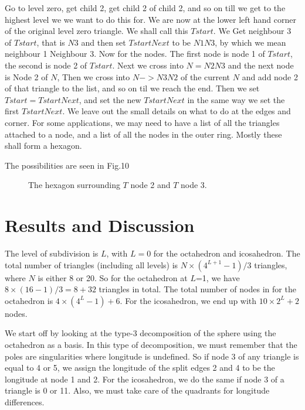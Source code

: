 \documentclass[12pt]{article}
\begin{document}
Go to level zero, get child 2, get child 2 of child 2, and so on till
we get to the highest level we we want to do this for. We are now at
the lower left hand corner of the original level zero triangle. We shall call this
$Tstart$. We Get neighbour 3 of $Tstart$, that is $N3$ and then 
set $TstartNext$ to be $N1N3$, by which we mean neighbour 1 Neighbour 3.
Now for the nodes. The first node is node 1 of $Tstart$, the second is
 node 2 of $Tstart$. Next we cross into $N=N2N3$ and the next node is Node
2 of $N$, Then we cross into $N->N3N2$ of the current $N$ and add node 2 of
that triangle to the list, and so on til we reach the end. Then we
set $Tstart=TstartNext$, and set the new $TstartNext$ in the same way we
set the first $TstartNext$. We leave out the small details on what to do
at the edges and corner.  For some applications, we may need to have
a list of all the triangles attached to a node, and a list of all the
nodes in the outer ring. Mostly these shall form a hexagon.

The possibilities are seen in Fig.10
\vspace*{10cm}
\begin{figure}[htb]
\caption{ 
The hexagon surrounding $T$ node 2 and $T$ node 3.
}
\end{figure}

\section{Results and Discussion}

The level of subdivision is $L$, with $L=0$ for the octahedron
and icosahedron. The total number of triangles (including
all levels) is $N \times (4^{L+1}-1)/3$ triangles,
 where $N$ is either
8 or 20. So for the octahedron at $L$=1, we have 
 $8 \times (16-1)/3=8+32$ triangles in total. The
total number of nodes in for the octahedron is
 $4 \times (4^L-1)+6$. For the icosahedron, we end up
with $10 \times 2^L+2$ nodes.

We start off by looking at the type-3 decomposition of the sphere
using the octahedron as a basis. In this type of decomposition, we must 
remember that the poles are singularities where longitude is undefined.
So if node 3 of any triangle is equal to 4 or 5, we assign the longitude
of the split edges 2 and 4 to be the longitude at node 1 and 2. For
the icosahedron, we do the same if node 3 of a triangle is 0 or 11.
Also, we must take care of the quadrants for longitude differences.
\end{document}
